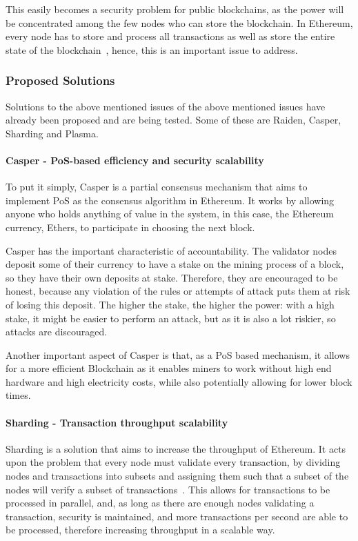 This easily becomes a security problem for public blockchains, as the power will be concentrated among the few nodes who can store the blockchain. In Ethereum, every node has to store and process all transactions as well as store the entire state of the blockchain~\cite{Scherer2017}, hence, this is an important issue to address. 


\subsubsection{Proposed Solutions}

Solutions to the above mentioned issues of the above mentioned issues have already been proposed and are being tested. Some of these are Raiden, Casper, Sharding and Plasma.

\paragraph{Casper - PoS-based efficiency and security scalability}

To put it simply, Casper is a partial consensus mechanism that aims to implement PoS as the consensus algorithm in Ethereum. It works by allowing anyone who holds anything of value in the system, in this case, the Ethereum currency, Ethers, to participate in choosing the next block.

Casper has the important characteristic of accountability. The validator nodes deposit some of their currency to have a stake on the mining process of a block, so they have their own deposits at stake. Therefore, they are encouraged to be honest, because any violation of the rules or attempts of attack puts them at risk of losing this deposit. The higher the stake, the higher the power: with a high stake, it might be easier to perform an attack, but as it is also a lot riskier, so attacks are discouraged.

Another important aspect of Casper is that, as a PoS based mechanism, it allows for a more efficient Blockchain as it enables miners to work without high end hardware and high electricity costs, while also potentially allowing for lower block times.

\paragraph{Sharding - Transaction throughput scalability}

Sharding is a solution that aims to increase the throughput of Ethereum. It acts upon the problem that every node must validate every transaction, by dividing nodes and transactions into subsets and assigning them such that a subset of the nodes will verify a subset of transactions~\cite{ButerinSharding}. This allows for transactions to be processed in parallel, and, as long as there are enough nodes validating a transaction, security is maintained, and more transactions per second are able to be processed, therefore increasing throughput in a scalable way.

